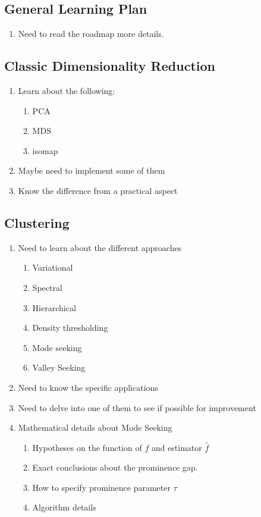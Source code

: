 \documentclass[10pt,a4paper]{article}
\begin{document}
\subsection{General Learning Plan}
\begin{enumerate}
	\item Need to read the roadmap\cite{Otter2017} more details.
\end{enumerate}
\subsection{Classic Dimensionality Reduction}
\begin{enumerate}
	\item Learn about the following:
	\begin{enumerate}
		\item PCA
		\item MDS
		\item isomap
	\end{enumerate}
	\item Maybe need to implement some of them
	\item Know the difference from a practical aspect
\end{enumerate}
\subsection{Clustering}
\begin{enumerate}
	\item Need to learn about the different approaches 
	\begin{enumerate}
		\item Variational
		\item Spectral
		\item Hierarchical
		\item Density thresholding
		\item Mode seeking
		\item Valley Seeking
	\end{enumerate}
	\item Need to know the specific applications
	\item Need to delve into one of them to see if possible for improvement
	\item Mathematical details about Mode Seeking
	\begin{enumerate}
		\item Hypotheses on the function of $f$ and estimator $\hat{f}$
		\item Exact conclusions about the prominence gap.
		\item How to specify prominence parameter $\tau$
		\item Algorithm details
	\end{enumerate}
\end{enumerate}
\end{document}
